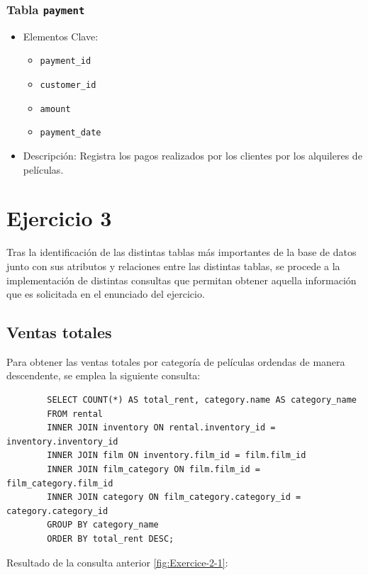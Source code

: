 \documentclass[10pt]{report}
\begin{document}
		\subsubsection{Tabla \texttt{payment}}
		\begin{itemize}
		  \item Elementos Clave:
		  \begin{itemize}
			\item \texttt{payment\_id}
			\item \texttt{customer\_id}
			\item \texttt{amount}
			\item \texttt{payment\_date}
		  \end{itemize}
		  \item Descripción: Registra los pagos realizados por los clientes por los alquileres de películas.
		\end{itemize}
	
	\section{Ejercicio 3}
	Tras la identificación de las distintas tablas más importantes de la base de datos junto con sus atributos  y relaciones entre las distintas tablas, se procede a la implementación de distintas consultas que permitan obtener aquella información que es solicitada en el enunciado del ejercicio.
\\
	\subsection{Ventas totales}
	Para obtener las ventas totales por categoría de películas ordendas de manera descendente, se emplea la siguiente consulta:

	\begin{verbatim}
		SELECT COUNT(*) AS total_rent, category.name AS category_name
		FROM rental
		INNER JOIN inventory ON rental.inventory_id = inventory.inventory_id
		INNER JOIN film ON inventory.film_id = film.film_id
		INNER JOIN film_category ON film.film_id = film_category.film_id
		INNER JOIN category ON film_category.category_id = category.category_id
		GROUP BY category_name
		ORDER BY total_rent DESC;
	\end{verbatim}

	Resultado de la consulta anterior \ref{fig:Exercice-2-1}:
\end{document}
